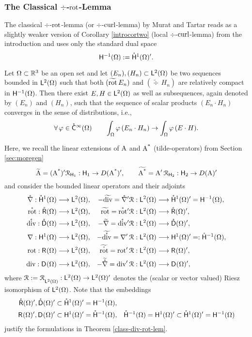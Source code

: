 \documentclass[a4paper]{amsart}
\newcommand{\To}{\longrightarrow}
\newcommand{\hmoc}{\mathring\hsymbol^{-1}}
\newcommand{\hmocom}{\hmoc(\om)}
\renewcommand{\H}{\mathsf{H}}
\renewcommand{\R}{\mathcal{R}}
\newcommand{\grad}{\na}
\newcommand{\gradc}{\mathring\grad}
\renewcommand{\rotc}{\mathring\rot}
\renewcommand{\divc}{\mathring\div}
\begin{document}
\subsubsection{The Classical $\div$-$\operatorname{rot}$-Lemma}

The classical $\div$-$\operatorname{rot}$-lemma (or $\div$-$\operatorname{curl}$-lemma)
by Murat \cite{murat1978} and Tartar \cite{tartar1979}
reads as a slightly weaker version of Corollary \ref{introcortwo} (local $\div$-$\operatorname{curl}$-lemma) 
from the introduction and uses only the standard dual space
$$\overset{}{\mathsf{H}}{}^{-1}_{}(\Omega):=\mathring{\mathsf{H}}^{1}(\Omega)'.$$

\begin{theo}
Let $\Omega\subset\mathbb{R}^{3}$ be an open set and
let $(E_{n}),(H_{n})\subset\overset{}{\mathsf{L}}{}^{2}_{}(\Omega)$ be two sequences bounded in $\overset{}{\mathsf{L}}{}^{2}_{}(\Omega)$ such that
both $(\widetilde{\operatorname{rot}}\,E_{n})$ and $(\widetilde{\div}\,H_{n})$ are relatively compact in $\overset{}{\mathsf{H}}{}^{-1}_{}(\Omega)$.
Then there exist $E,H\in\overset{}{\mathsf{L}}{}^{2}_{}(\Omega)$ as well as subsequences, again denoted by $(E_{n})$ and $(H_{n})$, 
such that the sequence of scalar products $(E_{n}\cdot H_{n})$ converges in the sense of distributions, i.e.,
$$\forall\,\varphi\in\mathring{\mathsf{C}}^{\infty}(\Omega)\qquad
\int_{\Omega}\varphi\,(E_{n}\cdot H_{n})
\to\int_{\Omega}\varphi\,(E\cdot H).$$
\end{theo}

Here, we recall the linear extensions of $\operatorname{A}$ and $\operatorname{\operatorname{A}^{*}}$ (tilde-operators) from Section \ref{sec:moregen} 
$$\widetilde{\A}=(\As)'\R_{\H_{1}}:\H_{1}\to D(\As)',\qquad
\widetilde{\As}=\A'\R_{\H_{2}}:\H_{2}\to D(\A)'$$
and consider the bounded linear operators and their adjoints
\begin{align*}
\gradc:\hocom&\To\ltom,
&
-\widetilde{\div}=\gradc{}'\R:\ltom&\To\hocom'=\hmoom,\\
\rotc:\rcom&\To\ltom,
&
\widetilde{\rot}=\rotc{}'\R:\ltom&\To\rcom',\\
\divc:\dcom&\To\ltom,
&
-\widetilde{\grad}=\divc{}'\R:\ltom&\To\dcom',\\
\grad:\hoom&\To\ltom,
&
-\widetilde{\divc}=\grad'\R:\ltom&\To\hoom'=:\hmocom,\\
\rot:\rom&\To\ltom,
&
\widetilde{\rotc}=\rot'\R:\ltom&\To\rom',\\
\div:\dom&\To\ltom,
&
-\widetilde{\gradc}=\div'\R:\ltom&\To\dom',
\end{align*}
where $\R:=\R_{\ltom}:\ltom\to\ltom'$ denotes the (scalar or vector valued) Riesz isomorphism of $\overset{}{\mathsf{L}}{}^{2}_{}(\Omega)$.
Note that the embeddings
\begin{align*}
\rcom',\dcom'&\subset\hocom'=\hmoom,\\
\rom',\dom'&\subset\hoom'=\hmocom,
&
\hmocom=\hoom'\subset\hocom'=\hmoom
\end{align*}
justify the formulations in Theorem \ref{class-div-rot-lem}.
\end{document}
